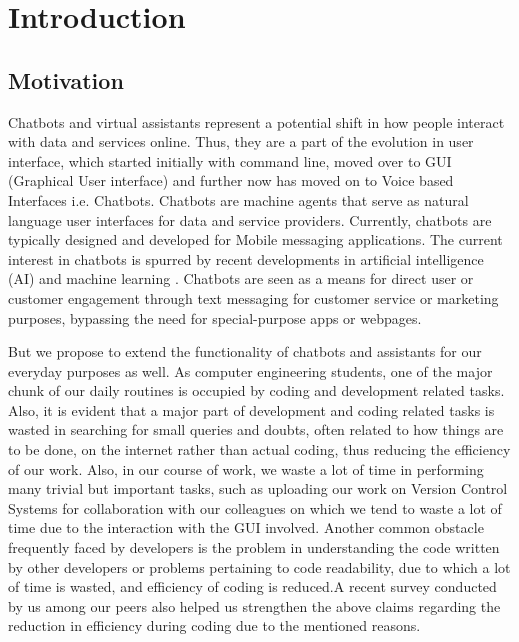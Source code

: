 \documentclass[oneside,a4paper,12pt, times]{book}
\begin{document}
\setlength{\parindent}{11mm}
\chapter{Introduction}

\section{Motivation}
\-\hspace{0.5in} Chatbots and virtual assistants represent a potential shift in how people interact with data and services online. Thus, they are a part of the evolution in user interface, which started initially with command line, moved over to GUI (Graphical User interface) and further now has moved on to Voice based Interfaces i.e. Chatbots. Chatbots are machine agents that serve as natural language user interfaces for data and service providers. Currently, chatbots are typically designed and developed for Mobile messaging applications. The current interest in chatbots is spurred by recent developments in artificial intelligence (AI) and machine learning . Chatbots are seen as a means for direct user or  customer engagement through text messaging for customer service or marketing purposes, bypassing the need for special-purpose apps or webpages.


But we propose to extend the functionality of chatbots and assistants for our everyday purposes as well. As computer engineering students, one of the major chunk of our daily routines is occupied by coding and development related tasks. Also, it is evident that a major part of development and coding related tasks is wasted in searching for small queries and doubts, often related to how things are to be done, on the internet rather than actual coding, thus reducing the efficiency of our work. Also, in our course of work, we waste a lot of time in performing many trivial but important tasks, such as uploading our work on Version Control Systems for collaboration with our colleagues on which we tend to waste a lot of time due to the interaction with the GUI involved. Another common obstacle frequently faced by developers is the problem in understanding the code written by other developers or problems pertaining to code readability, due to which a lot of time is wasted, and efficiency of coding is reduced.A recent survey conducted by us among our peers also helped us strengthen the above claims regarding the reduction in efficiency during coding due to the mentioned reasons. 
\end{document}

